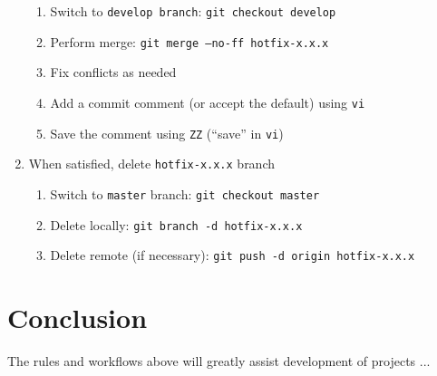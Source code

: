 \documentclass{article}
\begin{document}
\begin{enumerate}
\begin{enumerate}
    \item Switch to \texttt{develop branch}: \texttt{git checkout develop} 

    \item Perform merge: \texttt{git merge --no-ff hotfix-x.x.x} 
	
	\item Fix conflicts as needed
	
	\item Add a commit comment (or accept the default) using \texttt{vi} 
	
	\item Save the comment using \texttt{ZZ} (``save'' in \texttt{vi})

  \end{enumerate}
  \item When satisfied, delete \texttt{hotfix-x.x.x} branch
  \begin{enumerate}

    \item Switch to \texttt{master} branch: \texttt{git checkout master}

    \item Delete locally: \texttt{git branch -d hotfix-x.x.x}

    \item Delete remote (if necessary): \texttt{git push -d origin hotfix-x.x.x} 

  \end{enumerate}
  

\end{enumerate}


\section{Conclusion} 
\label{sec:conclusion}

The rules and workflows above will greatly assist development of projects ...








\end{document}
